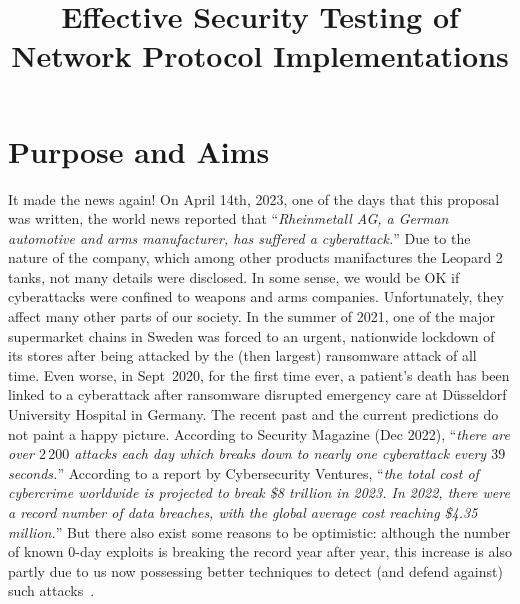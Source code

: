 \documentclass[11pt]{article}
\begin{document}
\title{\bf Effective Security Testing of Network Protocol Implementations}
\author{}
\date{}

\maketitle
\thispagestyle{plain}


\vspace*{-1.75em}

\section{Purpose and Aims}
It made the news again! On April 14th, 2023, one of the days that this
proposal was written, the world news reported that ``\textit{Rheinmetall
  AG, a German automotive and arms manufacturer, has suffered a
  cyberattack.}'' Due to the nature of the company, which among other products
manifactures the Leopard 2 tanks, not many details were disclosed. In
some sense, we would be OK if cyberattacks were confined to weapons and arms
companies. Unfortunately, they affect many other parts of our society. In the
summer of 2021, one of the major supermarket chains in Sweden was forced to an
urgent, nationwide lockdown of its stores after being attacked by the (then
largest) ransomware attack of all time. Even worse, in Sept~2020, for the
first time ever, a patient’s death has been linked to a cyberattack after
ransomware disrupted emergency care at Düsseldorf University Hospital in
Germany.
%
The recent past and the current predictions do not paint a happy picture.
According to Security Magazine (Dec 2022), ``\textit{there are over $2\,200$
attacks each day which breaks down to nearly one cyberattack every $39$ seconds.}''
%
According to a report by Cybersecurity Ventures, ``\textit{the total cost of
  cybercrime worldwide is projected to break \$8 trillion in 2023.
  In 2022, there were a record number of data breaches, with the
  global \emph{average} cost reaching \$4.35 million.}''
%
But there also exist some reasons to be optimistic: although the number of
known 0-day exploits is breaking the record year after year, this increase is
also partly due to us now possessing better techniques to detect (and defend
against) such attacks~\cite{ONeil@MIT-TR-21}.
\end{document}
